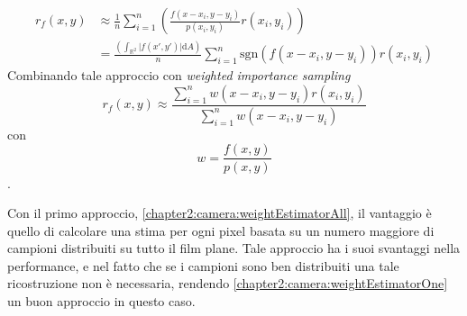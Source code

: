 \begin{align*}
	r_f(x,y) &\approx \frac{1}{n}\sum_{i=1}^n \left(\frac{f(x-x_i, y-y_i)}{p(x_i, y_i)} r(x_i, y_i)\right)\\
			&= \frac{\left(\displaystyle{\int_{\mathbb{R}^2}} \vert f(x',y')\vert \mathrm{d}A\right)}{n}\sum_{i=1}^n \mathrm{sgn}(f(x-x_i,y-y_i))r(x_i,y_i)
\end{align*}
Combinando tale approccio con \textit{weighted importance sampling}
\begin{equation}\label{chapter2:camera:weightEstimatorOne}
	r_f(x,y) \approx \frac{\sum_{i=1}^n w(x-x_i, y-y_i)r(x_i,y_i)}{\sum_{i=1}^n w(x-x_i, y-y_i)}
\end{equation}
con \[w=\frac{f(x,y)}{p(x,y)}\].\par
Con il primo approccio, \ref{chapter2:camera:weightEstimatorAll}, il vantaggio \`e quello di calcolare una stima per ogni pixel basata su un numero 
maggiore di campioni distribuiti su tutto il film plane. Tale approccio ha i suoi svantaggi nella performance, e nel fatto che se i campioni sono 
ben distribuiti una tale ricostruzione non \`e necessaria, rendendo \ref{chapter2:camera:weightEstimatorOne} un buon approccio in questo caso.
